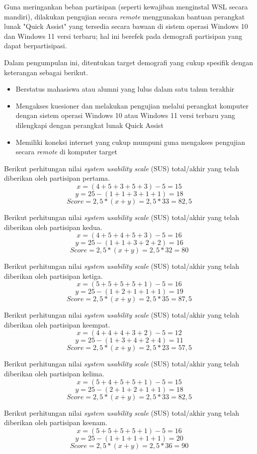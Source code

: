Guna meringankan beban partisipan (seperti kewajiban menginstal WSL secara mandiri), dilakukan pengujian secara \textit{remote} menggunakan bantuan perangkat lunak "Quick Assist" yang tersedia secara bawaan di sistem operasi Windows 10 dan Windows 11 versi terbaru; hal ini berefek pada demografi partisipan yang dapat berpartisipasi.

Dalam pengumpulan ini, ditentukan target demografi yang cukup spesifik dengan keterangan sebagai berikut.
\begin{itemize}
    \item Berstatus mahasiswa atau alumni yang lulus dalam satu tahun terakhir
    \item Mengakses kuesioner dan melakukan pengujian melalui perangkat komputer dengan sistem operasi Windows 10 atau Windows 11 versi terbaru yang dilengkapi dengan perangkat lunak Quick Assist
    \item Memiliki koneksi internet yang cukup mumpuni guna mengakses pengujian secara \textit{remote} di komputer target
\end{itemize}

Berikut perhitungan nilai \textit{system usability scale} (SUS) total/akhir yang telah diberikan oleh partisipan pertama.
\[x = (4 + 5 + 3 + 5 + 3) - 5 = 15\]
\[y = 25 - (1 + 1 + 3 + 1 + 1) = 18\]
\[Score = 2,5 * (x + y) = 2,5 * 33 = 82,5\]

Berikut perhitungan nilai \textit{system usability scale} (SUS) total/akhir yang telah diberikan oleh partisipan kedua.
\[x = (4 + 5 + 4 + 5 + 3) - 5 = 16\]
\[y = 25 - (1 + 1 + 3 + 2 + 2) = 16\]
\[Score = 2,5 * (x + y) = 2,5 * 32 = 80\]

Berikut perhitungan nilai \textit{system usability scale} (SUS) total/akhir yang telah diberikan oleh partisipan ketiga.
\[x = (5 + 5 + 5 + 5 + 1) - 5 = 16\]
\[y = 25 - (1 + 2 + 1 + 1 + 1) = 19\]
\[Score = 2,5 * (x + y) = 2,5 * 35 = 87,5\]

Berikut perhitungan nilai \textit{system usability scale} (SUS) total/akhir yang telah diberikan oleh partisipan keempat.
\[x = (4 + 4 + 4 + 3 + 2) - 5 = 12\]
\[y = 25 - (1 + 3 + 4 + 2 + 4) = 11\]
\[Score = 2,5 * (x + y) = 2,5 * 23 = 57,5\]

Berikut perhitungan nilai \textit{system usability scale} (SUS) total/akhir yang telah diberikan oleh partisipan kelima.
\[x = (5 + 4 + 5 + 5 + 1) - 5 = 15\]
\[y = 25 - (2 + 1 + 2 + 1 + 1) = 18\]
\[Score = 2,5 * (x + y) = 2,5 * 33 = 82,5\]

Berikut perhitungan nilai \textit{system usability scale} (SUS) total/akhir yang telah diberikan oleh partisipan keenam.
\[x = (5 + 5 + 5 + 5 + 1) - 5 = 16\]
\[y = 25 - (1 + 1 + 1 + 1 + 1) = 20\]
\[Score = 2,5 * (x + y) = 2,5 * 36 = 90\]

